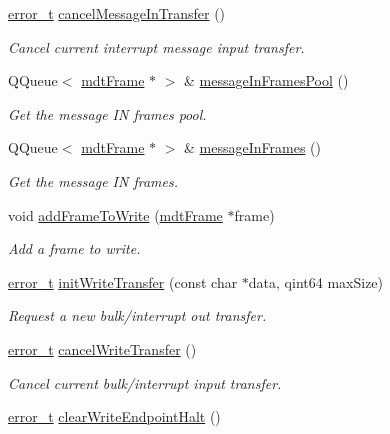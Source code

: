 \begin{DoxyCompactItemize}
\hyperlink{classmdt_abstract_port_ad4121bb930c95887e77f8bafa065a85e}{error\_\-t} \hyperlink{classmdt_usb_port_afddcb02a1e2bd87609fd2b6305534560}{cancelMessageInTransfer} ()
\begin{DoxyCompactList}\small\item\em Cancel current interrupt message input transfer. \end{DoxyCompactList}\item 
QQueue$<$ \hyperlink{classmdt_frame}{mdtFrame} $\ast$ $>$ \& \hyperlink{classmdt_usb_port_a3ad4385983122fcaf6d2560b6bd43acf}{messageInFramesPool} ()
\begin{DoxyCompactList}\small\item\em Get the message IN frames pool. \end{DoxyCompactList}\item 
QQueue$<$ \hyperlink{classmdt_frame}{mdtFrame} $\ast$ $>$ \& \hyperlink{classmdt_usb_port_a3365431076a3197540cbc99278658bda}{messageInFrames} ()
\begin{DoxyCompactList}\small\item\em Get the message IN frames. \end{DoxyCompactList}\item 
void \hyperlink{classmdt_usb_port_a38200f806037e06988e73af246e8a494}{addFrameToWrite} (\hyperlink{classmdt_frame}{mdtFrame} $\ast$frame)
\begin{DoxyCompactList}\small\item\em Add a frame to write. \end{DoxyCompactList}\item 
\hyperlink{classmdt_abstract_port_ad4121bb930c95887e77f8bafa065a85e}{error\_\-t} \hyperlink{classmdt_usb_port_a3340dc3f53e857e39053988e4925fc97}{initWriteTransfer} (const char $\ast$data, qint64 maxSize)
\begin{DoxyCompactList}\small\item\em Request a new bulk/interrupt out transfer. \end{DoxyCompactList}\item 
\hyperlink{classmdt_abstract_port_ad4121bb930c95887e77f8bafa065a85e}{error\_\-t} \hyperlink{classmdt_usb_port_a7cbe1cd3649861aac5e6a14830f06cf9}{cancelWriteTransfer} ()
\begin{DoxyCompactList}\small\item\em Cancel current bulk/interrupt input transfer. \end{DoxyCompactList}\item 
\hyperlink{classmdt_abstract_port_ad4121bb930c95887e77f8bafa065a85e}{error\_\-t} \hyperlink{classmdt_usb_port_a2dd0f7c680fda1ca1247217fa4e3f2e8}{clearWriteEndpointHalt} ()

\end{DoxyCompactItemize}
